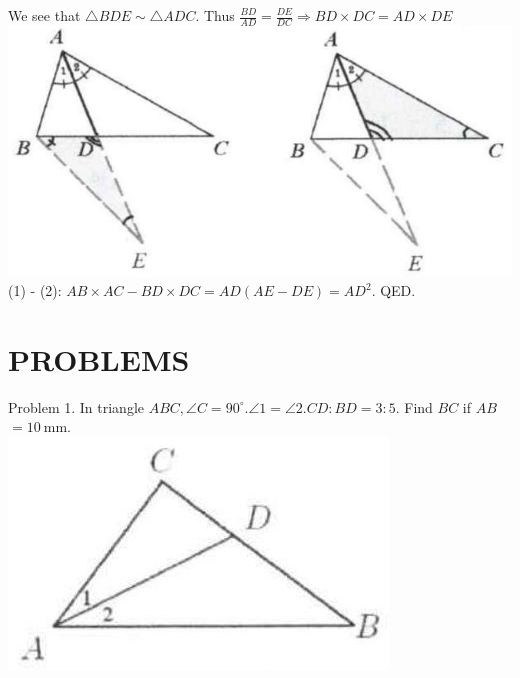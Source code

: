 \documentclass[10pt]{article}
\begin{document}
We see that \(\triangle B D E \sim \triangle A D C\). Thus \(\frac{B D}{A D}=\frac{D E}{D C} \Rightarrow B D \times D C=A D \times D E\)\\
\includegraphics[max width=\textwidth, center]{2025_04_17_97bc1f7e44d93c271a88g-063}\\
(1) - (2): \(A B \times A C-B D \times D C=A D(A E-D E)=A D^{2}\). QED.

\section*{PROBLEMS}
Problem 1. In triangle \(A B C, \angle C=90^{\circ} . \angle 1=\angle 2 . C D: B D=3: 5\). Find \(B C\) if \(A B\) \(=10 \mathrm{~mm}\).\\
\includegraphics[max width=\textwidth, center]{2025_04_17_97bc1f7e44d93c271a88g-064(1)}
\end{document}
